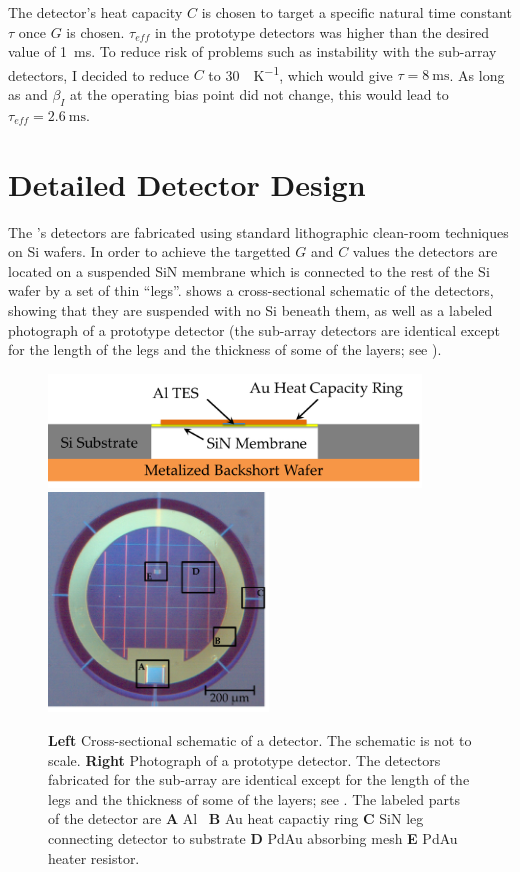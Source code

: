 The detector's heat capacity $C$ is chosen to target a specific natural time constant $\tau$ once $G$ is chosen.
$\tau_{eff}$ in the prototype detectors was higher than the desired value of \SI{1}{\ms}.
To reduce risk of problems such as instability with the sub-array detectors, I decided to reduce $C$ to \SI{30}{\pJ\per\K}, which would give $\tau = \SI{8}{\ms}$.
As long as \Loop and $\beta_I$ at the operating bias point did not change, this would lead to $\tau_{eff} = \SI{2.6}{\ms}$.

\section{Detailed Detector Design} \label{sec:ch5-det-design}

The \Imager's detectors are fabricated using standard lithographic clean-room techniques on Si wafers.
In order to achieve the targetted $G$ and $C$ values the detectors are located on a suspended SiN membrane which is connected to the rest of the Si wafer by a set of thin ``legs''.
 shows a cross-sectional schematic of the detectors, showing that they are suspended with no Si beneath them, as well as a labeled photograph of a prototype detector (the sub-array detectors are identical except for the length of the legs and the thickness of some of the layers; see ).

\begin{figure}
\centering
\includegraphics[width=3.9in]{images/ch5-det-schematic.png}
\includegraphics[width=2.3in]{images/ch5-proto-pixel-labeled.png}
\caption[Detector cross-section and photograph]{
  \textbf{Left} Cross-sectional schematic of a \Imager detector.
  The schematic is not to scale.
  \textbf{Right} Photograph of a prototype detector.
  The detectors fabricated for the sub-array are identical except for the length of the legs and the thickness of some of the layers; see .
  The labeled parts of the detector are \textbf{A} Al \TES\ \textbf{B} Au heat capactiy ring \textbf{C} SiN leg connecting detector to substrate \textbf{D} PdAu absorbing mesh \textbf{E} PdAu heater resistor.
}
\label{fig:ch5-det-layout}
\end{figure}

